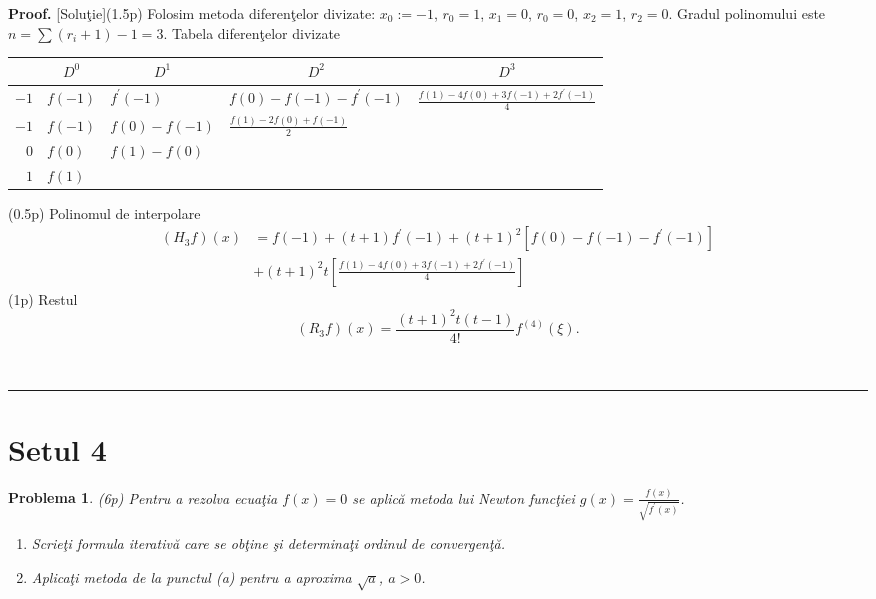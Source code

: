\documentclass{article}%
\newtheorem{problem}[theorem]{Problema}
\newenvironment{proof}[1][Proof]{\noindent\textbf{#1.} }{\ \rule{0.5em}{0.5em}}
\begin{document}
\begin{proof}
[Solu\c{t}ie](1.5p) Folosim metoda diferen\c{t}elor divizate: $x_{0}:=-1$,
$r_{0}=1$, $x_{1}=0$, $r_{0}=0$, $x_{2}=1$, $r_{2}=0$. Gradul polinomului este
$n=\sum(r_{i}+1)-1=3$. Tabela diferen\c{t}elor divizate%

\begin{tabular}
[c]{r|cccc}
& $D^{0}$ & $D^{1}$ & $D^{2}$ & $D^{3}$\\\hline
$-1$ & \multicolumn{1}{|l}{$f(-1)$} & \multicolumn{1}{l}{$f^{\prime}(-1)$} &
\multicolumn{1}{l}{$f(0)-f(-1)-f^{\prime}(-1)$} & \multicolumn{1}{l}{$\frac
{f(1)-4f(0)+3f(-1)+2f^{\prime}(-1)}{4}$}\\
$-1$ & \multicolumn{1}{|l}{$f(-1)$} & \multicolumn{1}{l}{$f(0)-f(-1)$} &
\multicolumn{1}{l}{$\frac{f(1)-2f(0)+f(-1)}{2}$} & \multicolumn{1}{l}{}\\
$0$ & \multicolumn{1}{|l}{$f(0)$} & \multicolumn{1}{l}{$f(1)-f(0)$} &
\multicolumn{1}{l}{} & \multicolumn{1}{l}{}\\
$1$ & \multicolumn{1}{|l}{$f(1)$} & \multicolumn{1}{l}{} &
\multicolumn{1}{l}{} & \multicolumn{1}{l}{}%
\end{tabular}


(0.5p) Polinomul de interpolare%
\begin{align*}
\left(  H_{3}f\right)  (x)  &  =f(-1)+(t+1)f^{\prime}(-1)+(t+1)^{2}\left[
f(0)-f(-1)-f^{\prime}(-1)\right] \\
&  +(t+1)^{2}t\left[  \frac{f(1)-4f(0)+3f(-1)+2f^{\prime}(-1)}{4}\right]
\end{align*}
(1p) Restul%
\[
\left(  R_{3}f\right)  (x)=\frac{(t+1)^{2}t(t-1)}{4!}f^{(4)}(\xi).
\]

\end{proof}

\section*{Setul 4}

\begin{problem}
(6p) Pentru a rezolva ecua\c{t}ia $f(x)=0$ se aplic\u{a} metoda lui Newton
func\c{t}iei $g(x)=\frac{f(x)}{\sqrt{f^{\prime}(x)}}$.

\begin{enumerate}
\item[(a)] Scrie\c{t}i formula iterativ\u{a} care se ob\c{t}ine \c{s}i
determina\c{t}i ordinul de convergen\c{t}\u{a}.

\item[(b)] Aplica\c{t}i metoda de la punctul (a) pentru a aproxima $\sqrt{a}$,
$a>0$.
\end{enumerate}
\end{problem}
\end{document}
